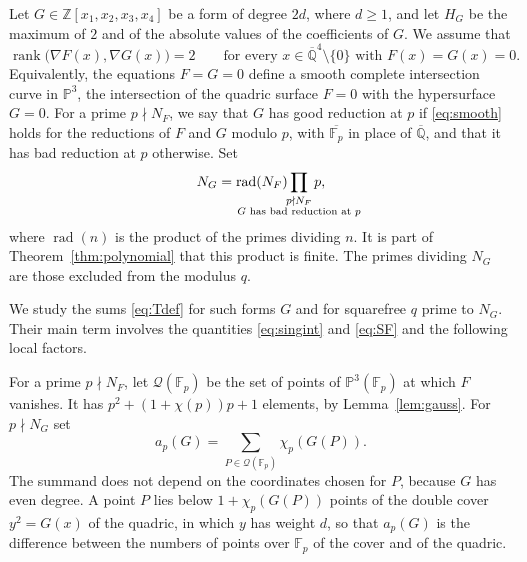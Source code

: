 \documentclass[11pt]{amsart}
\numberwithin{equation}{section}
\numberwithin{figure}{section}
\theoremstyle{definition}
\newcommand{\Z}{\mathbb{Z}}
\newcommand{\Q}{\mathbb{Q}}
\newcommand{\Fp}{\mathbb F_p}
\newcommand{\PP}{\mathbb P}
\newcommand{\Qc}{\mathcal Q}
\newcommand{\rad}{\operatorname{rad}}
\begin{document}
Let $G\in\Z[x_1,x_2,x_3,x_4]$ be a form of degree $2d$, where $d\ge1$,
and let $H_G$ be the maximum of $2$ and of the absolute values of the
coefficients of $G$. We assume that
\begin{equation}\label{eq:smooth}
 \operatorname{rank}\big(\nabla F(x),\nabla G(x)\big)=2
 \qquad\text{for every }x\in\overline{\Q}^4\setminus\{0\}
 \text{ with }F(x)=G(x)=0.
\end{equation}
Equivalently, the equations $F=G=0$ define a smooth complete
intersection curve in $\PP^3$, the intersection of the quadric
surface $F=0$ with the hypersurface $G=0$. For a prime $p\nmid N_F$,
we say that $G$ has good reduction at $p$ if \eqref{eq:smooth} holds
for the reductions of $F$ and $G$ modulo $p$, with $\overline{\Fp}$ in
place of $\overline{\Q}$, and that it has bad reduction at $p$
otherwise. Set
\begin{equation}\label{eq:NG}
 N_G=\rad(N_F)\prod_{\mathclap{\substack{p\nmid N_F\\G\text{ has bad reduction at }p}}}\;p,
\end{equation}
where $\rad(n)$ is the product of the primes dividing $n$. It is part
of Theorem~\ref{thm:polynomial} that this product is finite. The
primes dividing $N_G$ are those excluded from the modulus $q$.

We study the sums \eqref{eq:Tdef} for such forms $G$ and for
squarefree $q$ prime to $N_G$. Their main term involves the
quantities \eqref{eq:singint} and \eqref{eq:SF} and the following
local factors.

For a prime $p\nmid N_F$, let $\Qc(\Fp)$ be the set of points of
$\PP^3(\Fp)$ at which $F$ vanishes. It has $p^2+(1+\chi(p))p+1$
elements, by Lemma~\ref{lem:gauss}. For $p\nmid N_G$ set
\begin{equation}\label{eq:apdef}
 a_p(G)=\sum_{P\in\Qc(\Fp)}\chi_p(G(P)).
\end{equation}
The summand does not depend on the coordinates chosen for $P$, because
$G$ has even degree. A point $P$ lies below $1+\chi_p(G(P))$ points of
the double cover $y^2=G(x)$ of the quadric, in which $y$ has weight
$d$, so that $a_p(G)$ is the
difference between the numbers of points over $\Fp$ of the cover and
of the quadric.
\end{document}
